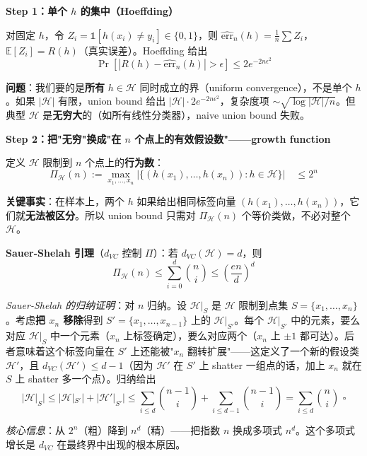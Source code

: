 \documentclass[12pt, a4paper]{ctexart}
\begin{document}
\begin{blackboard}[VC 界的三步证明]

\textbf{Step 1：单个 $h$ 的集中（Hoeffding）}

对固定 $h$，令 $Z_i = \mathbb{1}[h(x_i) \neq y_i] \in \{0, 1\}$，则 $\widehat{\mathrm{err}}_n(h) = \tfrac{1}{n}\sum Z_i$，$\mathbb{E}[Z_i] = R(h)$（真实误差）。Hoeffding 给出
\[
\Pr\!\left[|R(h) - \widehat{\mathrm{err}}_n(h)| > \epsilon\right] \leq 2 e^{-2n\epsilon^2}
\]

\textbf{问题}：我们要的是\textbf{所有} $h \in \mathcal{H}$ 同时成立的界（uniform convergence），不是单个 $h$。如果 $|\mathcal{H}|$ 有限，union bound 给出 $|\mathcal{H}| \cdot 2 e^{-2n\epsilon^2}$，复杂度项 $\sim \sqrt{\log|\mathcal{H}|/n}$。但典型 $\mathcal{H}$ 是\textbf{无穷大}的（如所有线性分类器），naive union bound 失败。

\textbf{Step 2：把"无穷"换成"在 $n$ 个点上的有效假设数"——growth function}

定义 $\mathcal{H}$ 限制到 $n$ 个点上的\textbf{行为数}：
\[
\Pi_{\mathcal{H}}(n) := \max_{x_1, \ldots, x_n} \bigl|\{(h(x_1), \ldots, h(x_n)) : h \in \mathcal{H}\}\bigr| \quad \leq 2^n
\]

\textbf{关键事实}：在样本上，两个 $h$ 如果给出相同标签向量 $(h(x_1), \ldots, h(x_n))$，它们就\textbf{无法被区分}。所以 union bound 只需对 $\Pi_{\mathcal{H}}(n)$ 个等价类做，不必对整个 $\mathcal{H}$。

\textbf{Sauer-Shelah 引理}（$d_{VC}$ 控制 $\Pi$）：若 $d_{VC}(\mathcal{H}) = d$，则
\[
\boxed{\Pi_{\mathcal{H}}(n) \leq \sum_{i=0}^{d}\binom{n}{i} \leq \left(\frac{en}{d}\right)^d}
\]

\textit{Sauer-Shelah 的归纳证明}：对 $n$ 归纳。设 $\mathcal{H}|_S$ 是 $\mathcal{H}$ 限制到点集 $S = \{x_1, \ldots, x_n\}$。考虑\textbf{把 $x_n$ 移除}得到 $S' = \{x_1, \ldots, x_{n-1}\}$ 上的 $\mathcal{H}|_{S'}$。每个 $\mathcal{H}|_{S'}$ 中的元素，要么对应 $\mathcal{H}|_S$ 中一个元素（$x_n$ 上标签确定），要么对应两个（$x_n$ 上 $\pm 1$ 都可达）。后者意味着这个标签向量在 $S'$ 上还能被"$x_n$ 翻转扩展"——这定义了一个新的假设类 $\mathcal{H}'$，且 $d_{VC}(\mathcal{H}') \leq d - 1$（因为 $\mathcal{H}'$ 在 $S'$ 上 shatter 一组点的话，加上 $x_n$ 就在 $S$ 上 shatter 多一个点）。归纳给出
\[
|\mathcal{H}|_S| \leq |\mathcal{H}|_{S'}| + |\mathcal{H}'|_{S'}| \leq \sum_{i \leq d}\binom{n-1}{i} + \sum_{i \leq d-1}\binom{n-1}{i} = \sum_{i \leq d}\binom{n}{i}\,\, \square
\]

\textit{核心信息}：从 $2^n$（粗）降到 $n^d$（精）——把指数 $n$ 换成多项式 $n^d$。这个多项式增长是 $d_{VC}$ 在最终界中出现的根本原因。


\end{blackboard}
\end{document}
